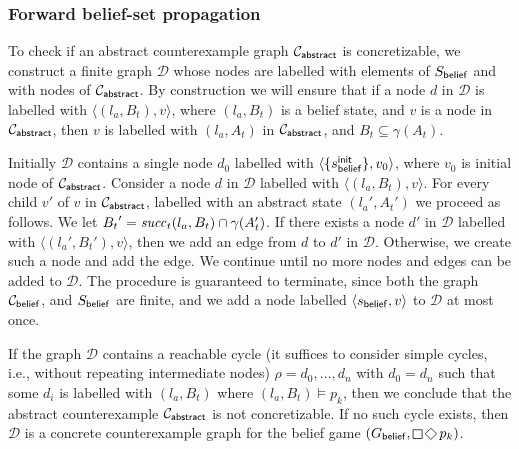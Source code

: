 \subsubsection{Forward belief-set propagation}

To check if an abstract counterexample graph $\mathcal{C}_{\mathsf{abstract}}$ is concretizable, we construct a finite graph $\mathcal{D}$ whose nodes are labelled with elements of $S_{\mathsf{belief}}$ and with nodes of $\mathcal{C}_{\mathsf{abstract}}$.
By construction we will ensure that if a node $d$ in $\mathcal D$ is labelled with $\langle(l_a,B_t),v \rangle$, where $(l_a,B_t)$ is a belief state, and $v$ is a node in $\mathcal{C}_{\mathsf{abstract}}$, then $v$ is labelled with $(l_a,A_t)$ in $\mathcal{C}_{\mathsf{abstract}}$, and $B_t \subseteq \gamma(A_t)$. 

Initially $\mathcal D$ contains a single node $d_0$ labelled with $\langle\{s_{\mathsf{belief}}^{\mathsf{init}}\},v_0\rangle$, where $v_0$ is initial node of $\mathcal{C}_{\mathsf{abstract}}$. Consider a node $d$ in $\mathcal D$ labelled with $\langle(l_a,B_t),v \rangle$. For every child $v'$ of $v$ in $\mathcal{C}_{\mathsf{abstract}}$, labelled with an abstract state $(l_a',A_t')$ we proceed as follows. We let ${B_t}' = \mathit{succ}_t(l_a,B_t) \cap \gamma(A_t')$. If there exists a node $d'$ in $\mathcal D$ labelled with $\langle (l_a',B_t'),v\rangle$, then we add an edge from $d$ to $d'$ in $\mathcal{D}$. Otherwise, we create such a node and add the edge. We continue until no more nodes and edges can be added to $\mathcal D$. The procedure is guaranteed to terminate, since both  the graph $\mathcal{C}_{\mathsf{belief}}$, and $S_{\mathsf{belief}}$ are finite, and we add a node labelled $\langle s_{\mathsf{belief}}, v\rangle$ to $\mathcal D$ at most once.

If the graph $\mathcal D$ contains a reachable cycle (it suffices to consider simple cycles, i.e., without repeating intermediate nodes) $\rho = d_0,\ldots,d_n$ with $d_0 = d_n$ such that some $d_i$ is labelled with $(l_a,B_t)$ where $(l_a,B_t) \models p_k$, then we conclude that the abstract counterexample $\mathcal{C}_{\mathsf{abstract}}$ is not concretizable. If no such cycle exists, then $\mathcal D$ is a concrete counterexample graph for the belief game $(G_\belief,\LTLglobally\LTLfinally p_k)$. 

